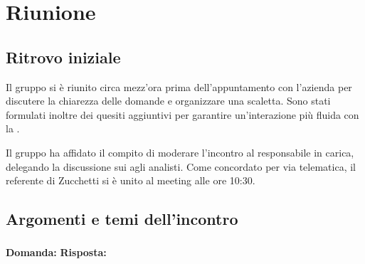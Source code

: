 \section{Riunione}
\subsection{Ritrovo iniziale}
Il gruppo si è riunito circa mezz’ora prima dell’appuntamento con l’azienda per discutere la chiarezza delle domande e organizzare una scaletta. Sono stati formulati inoltre dei quesiti aggiuntivi per garantire un’interazione più fluida con la .

Il gruppo ha affidato il compito di moderare l’incontro al responsabile in carica, delegando la discussione sui  agli analisti. Come concordato per via telematica, il referente di Zucchetti si è unito al meeting alle ore 10:30.

\subsection{Argomenti e temi dell'incontro}


\subsubsection{}


\textbf{Domanda:} 
\textbf{Risposta:} 
